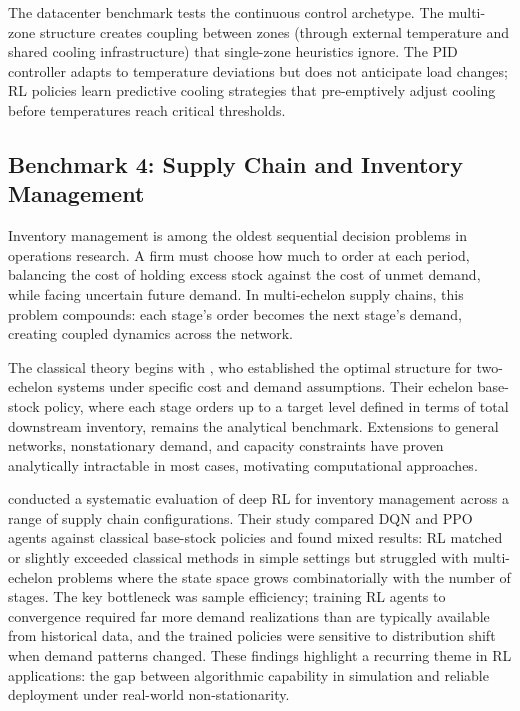 

The datacenter benchmark tests the continuous control archetype. The multi-zone structure creates coupling between zones (through external temperature and shared cooling infrastructure) that single-zone heuristics ignore. The PID controller adapts to temperature deviations but does not anticipate load changes; RL policies learn predictive cooling strategies that pre-emptively adjust cooling before temperatures reach critical thresholds.


\subsection{Benchmark 4: Supply Chain and Inventory Management}
\label{sec:benchmark_inventory}

Inventory management is among the oldest sequential decision problems in operations research. A firm must choose how much to order at each period, balancing the cost of holding excess stock against the cost of unmet demand, while facing uncertain future demand. In multi-echelon supply chains, this problem compounds: each stage's order becomes the next stage's demand, creating coupled dynamics across the network.

The classical theory begins with \citet{ClarkScarf1960inventory}, who established the optimal structure for two-echelon systems under specific cost and demand assumptions. Their echelon base-stock policy, where each stage orders up to a target level defined in terms of total downstream inventory, remains the analytical benchmark. Extensions to general networks, nonstationary demand, and capacity constraints have proven analytically intractable in most cases, motivating computational approaches.

\citet{Gijsbrechts2022inventory} conducted a systematic evaluation of deep RL for inventory management across a range of supply chain configurations. Their study compared DQN and PPO agents against classical base-stock policies and found mixed results: RL matched or slightly exceeded classical methods in simple settings but struggled with multi-echelon problems where the state space grows combinatorially with the number of stages. The key bottleneck was sample efficiency; training RL agents to convergence required far more demand realizations than are typically available from historical data, and the trained policies were sensitive to distribution shift when demand patterns changed. These findings highlight a recurring theme in RL applications: the gap between algorithmic capability in simulation and reliable deployment under real-world non-stationarity.

